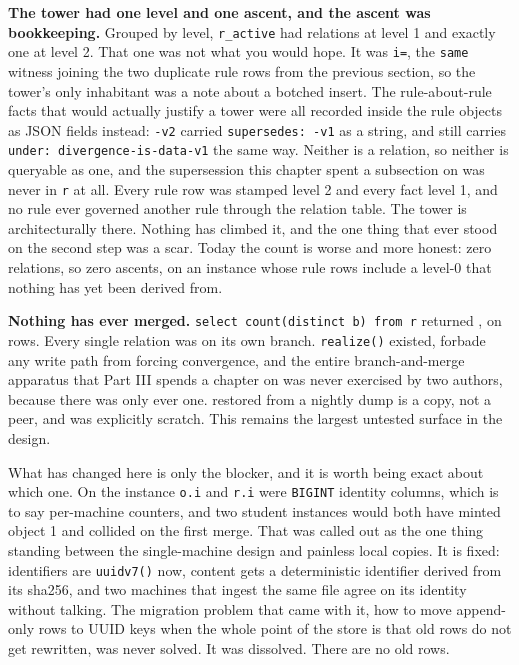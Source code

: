\textbf{The tower had one level and one ascent, and the ascent was bookkeeping.} Grouped by level, \texttt{r\_active} had \labLineageLevelOne{} relations at level 1 and exactly one at level 2. That one was not what you would hope. It was \texttt{i=\labLineageDupRel{}}, the \texttt{same} witness joining the two duplicate rule rows from the previous section, so the tower's only inhabitant was a note about a botched insert. The rule-about-rule facts that would actually justify a tower were all recorded inside the rule objects as JSON fields instead: \texttt{\labLineageTissueRuleName{}-v2} carried \texttt{supersedes: \labLineageTissueRuleName{}-v1} as a string, and  still carries \texttt{under: divergence-is-data-v1} the same way. Neither is a relation, so neither is queryable as one, and the supersession this chapter spent a subsection on was never in \texttt{r} at all. Every rule row was stamped level 2 and every fact level 1, and no rule ever governed another rule through the relation table. The tower is architecturally there. Nothing has climbed it, and the one thing that ever stood on the second step was a scar. Today the count is worse and more honest: zero relations, so zero ascents, on an instance whose rule rows include a level-0 that nothing has yet been derived from.

\textbf{Nothing has ever merged.} \texttt{select count(distinct b) from r} returned \labLineageRelations{}, on \labLineageRelations{} rows. Every single relation was on its own branch. \texttt{realize()} existed,  forbade any write path from forcing convergence, and the entire branch-and-merge apparatus that Part III spends a chapter on was never exercised by two authors, because there was only ever one. \labLineagePeerMachine{} restored from a nightly dump is a copy, not a peer, and was explicitly scratch. This remains the largest untested surface in the design.

What has changed here is only the blocker, and it is worth being exact about which one. On the \labLineageName{} instance \texttt{o.i} and \texttt{r.i} were \texttt{BIGINT} identity columns, which is to say per-machine counters, and two student instances would both have minted object 1 and collided on the first merge. That was called out as the one thing standing between the single-machine design and painless local copies. It is fixed: identifiers are \texttt{uuidv7()} now, content gets a deterministic identifier derived from its sha256, and two machines that ingest the same file agree on its identity without talking. The migration problem that came with it, how to move \labLineageObjects{} append-only rows to UUID keys when the whole point of the store is that old rows do not get rewritten, was never solved. It was dissolved. There are no old rows.

